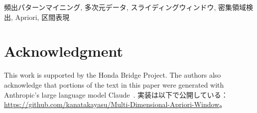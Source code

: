 \documentclass[conference]{IEEEtran}
\begin{document}
\begin{IEEEkeywords}
頻出パターンマイニング, 多次元データ, スライディングウィンドウ,
密集領域検出, Apriori, 区間表現
\end{IEEEkeywords}








\section*{Acknowledgment}
This work is supported by the Honda Bridge Project.
The authors also acknowledge that portions of the text in
this paper were generated with Anthropic's large language
model Claude~\cite{claude2025}.
実装は以下で公開している：
\url{https://github.com/kanatakayasu/Multi-Dimensional-Apriori-Window}。

\newpage



\clearpage
\appendices

\end{document}

